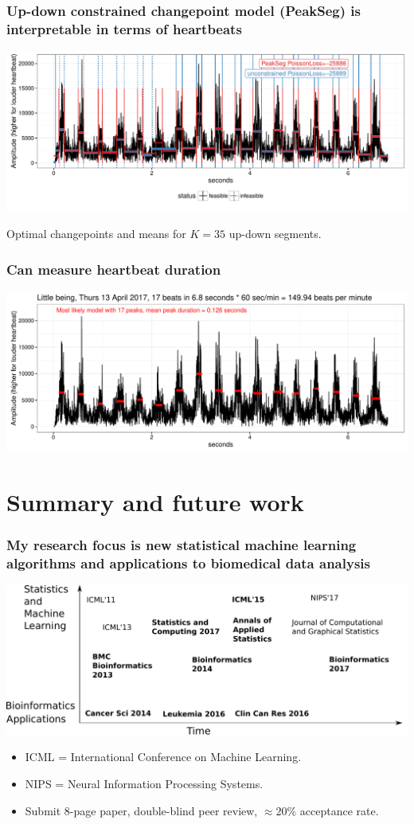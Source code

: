 \documentclass{beamer}
\begin{document}
\begin{frame}
  \frametitle{Up-down constrained changepoint
model (PeakSeg) is interpretable in terms of heartbeats}
  \includegraphics[width=\textwidth]{figure-heartbeat-PeakSeg}

Optimal changepoints and means for $K=35$ up-down segments.
\end{frame}

\begin{frame}
  \frametitle{Can measure heartbeat duration}
  \includegraphics[width=\textwidth]{figure-heartbeat}



\end{frame}
 
\section{Summary and future work}

\begin{frame}
  \frametitle{My research focus is new statistical machine learning algorithms and applications to biomedical data analysis}
  \includegraphics[width=\textwidth]{timeline-SteJustine}

  \begin{itemize}
  \item ICML = International Conference on Machine Learning.
  \item NIPS = Neural Information Processing Systems.
  \item Submit 8-page paper, double-blind peer review, $\approx 20\%$ acceptance
    rate.
  \end{itemize}
\end{frame}
\end{document}
